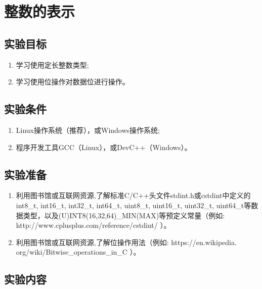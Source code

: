 
\chapter{整数的表示}

\section{实验目标}

\begin{enumerate}
	\item 学习使用定长整数类型;
	\item 学习使用位操作对数据位进行操作。
\end{enumerate}

\section{实验条件}

\begin{enumerate}
	\item Linux操作系统（推荐），或Windows操作系统;
	\item 程序开发工具GCC（Linux），或DevC++（Windows）。
\end{enumerate}

\section{实验准备}

\begin{enumerate}
	\item 利用图书馆或互联网资源,了解标准C/C++头文件stdint.h或cstdint中定义的int8\_t, int16\_t, int32\_t, int64\_t, uint8\_t, uint16\_t, uint32\_t, uint64\_t等数据类型，以及(U)INT8(16,32,64)\_MIN(MAX)等预定义常量（例如: http://www.cplusplus.com/reference/cstdint/ ）。
	\item 利用图书馆或互联网资源,了解位操作用法（例如: https://en.wikipedia.
		org/wiki/Bitwise\_operations\_in\_C ）。
\end{enumerate}

\section{实验内容}

